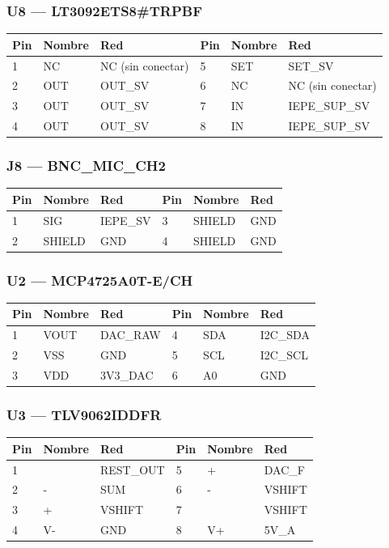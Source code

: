 \documentclass[10pt,a4paper]{article}
\begin{document}
\subsubsection*{U8 — LT3092ETS8\#TRPBF}
{\footnotesize\begin{tabular}{@{}lll|lll@{}}\toprule
\textbf{Pin} & \textbf{Nombre} & \textbf{Red} & \textbf{Pin} & \textbf{Nombre} & \textbf{Red}\\\midrule
1 & NC & NC (sin conectar) & 5 & SET & SET\_\allowbreak{}SV\\
2 & OUT & OUT\_\allowbreak{}SV & 6 & NC & NC (sin conectar)\\
3 & OUT & OUT\_\allowbreak{}SV & 7 & IN & IEPE\_\allowbreak{}SUP\_\allowbreak{}SV\\
4 & OUT & OUT\_\allowbreak{}SV & 8 & IN & IEPE\_\allowbreak{}SUP\_\allowbreak{}SV\\
\bottomrule\end{tabular}}
\subsubsection*{J8 — BNC\_\allowbreak{}MIC\_\allowbreak{}CH2}
{\footnotesize\begin{tabular}{@{}lll|lll@{}}\toprule
\textbf{Pin} & \textbf{Nombre} & \textbf{Red} & \textbf{Pin} & \textbf{Nombre} & \textbf{Red}\\\midrule
1 & SIG & IEPE\_\allowbreak{}SV & 3 & SHIELD & GND\\
2 & SHIELD & GND & 4 & SHIELD & GND\\
\bottomrule\end{tabular}}
\subsubsection*{U2 — MCP4725A0T-E/CH}
{\footnotesize\begin{tabular}{@{}lll|lll@{}}\toprule
\textbf{Pin} & \textbf{Nombre} & \textbf{Red} & \textbf{Pin} & \textbf{Nombre} & \textbf{Red}\\\midrule
1 & VOUT & DAC\_\allowbreak{}RAW & 4 & SDA & I2C\_\allowbreak{}SDA\\
2 & VSS & GND & 5 & SCL & I2C\_\allowbreak{}SCL\\
3 & VDD & 3V3\_\allowbreak{}DAC & 6 & A0 & GND\\
\bottomrule\end{tabular}}
\subsubsection*{U3 — TLV9062IDDFR}
{\footnotesize\begin{tabular}{@{}lll|lll@{}}\toprule
\textbf{Pin} & \textbf{Nombre} & \textbf{Red} & \textbf{Pin} & \textbf{Nombre} & \textbf{Red}\\\midrule
1 &  & REST\_\allowbreak{}OUT & 5 & + & DAC\_\allowbreak{}F\\
2 & - & SUM & 6 & - & VSHIFT\\
3 & + & VSHIFT & 7 &  & VSHIFT\\
4 & V- & GND & 8 & V+ & 5V\_\allowbreak{}A\\
\bottomrule\end{tabular}}
\end{document}
